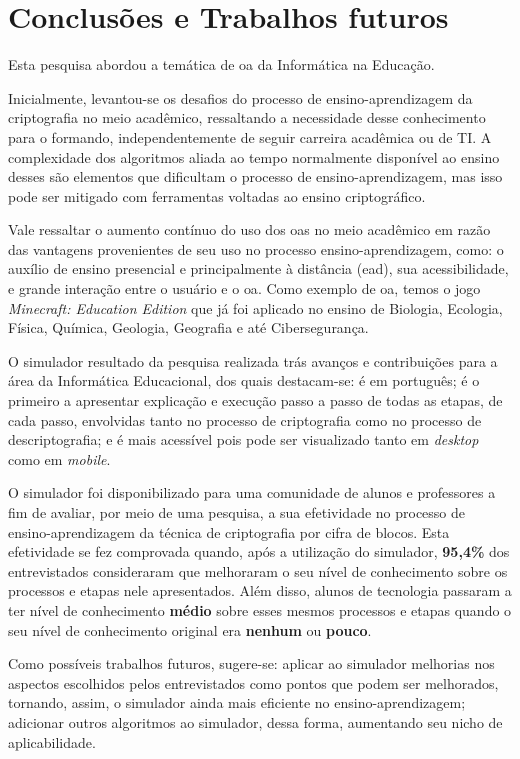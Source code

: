 \chapter{Conclusões e Trabalhos futuros}
\label{char:conclusoesetrabfuturos}
Esta pesquisa abordou a temática de \acrfull{oa} da Informática na Educação.

Inicialmente, levantou-se os desafios do processo de ensino-aprendizagem da criptografia no meio acadêmico, ressaltando a necessidade desse conhecimento para o formando, independentemente de seguir carreira acadêmica ou de TI. A complexidade dos algoritmos aliada ao tempo normalmente disponível ao ensino desses são elementos que dificultam o processo de ensino-aprendizagem, mas isso pode ser mitigado com ferramentas voltadas ao ensino criptográfico.

Vale ressaltar o aumento contínuo do uso dos \acrshort{oas} no meio acadêmico em razão das vantagens provenientes de seu uso no processo ensino-aprendizagem, como: o auxílio de ensino presencial e principalmente à distância (\acrshort{ead}), sua acessibilidade, e grande interação entre o usuário e o \acrshort{oa}. Como exemplo de \acrshort{oa}, temos o jogo \textit{Minecraft: Education Edition} que já foi aplicado no ensino de Biologia, Ecologia, Física, Química, Geologia, Geografia e até Cibersegurança.

O simulador resultado da pesquisa realizada trás avanços e contribuições para a área da Informática Educacional, dos quais destacam-se: é em português; é o primeiro a apresentar explicação e execução passo a passo de todas as etapas, de cada passo, envolvidas tanto no processo de criptografia como no processo de descriptografia; e é mais acessível pois pode ser visualizado tanto em \textit{desktop} como em \textit{mobile}.

O simulador foi disponibilizado para uma comunidade de alunos e professores a fim de avaliar, por meio de uma pesquisa, a sua efetividade no processo de ensino-aprendizagem da técnica de criptografia por cifra de blocos. Esta efetividade se fez comprovada quando, após a utilização do simulador, \textbf{95,4\%} dos entrevistados consideraram que melhoraram o seu nível de conhecimento sobre os processos e etapas nele apresentados. Além disso, alunos de tecnologia passaram a ter nível de conhecimento \textbf{médio} sobre esses mesmos processos e etapas quando o seu nível de conhecimento original era \textbf{nenhum} ou \textbf{pouco}.

Como possíveis trabalhos futuros, sugere-se: aplicar ao simulador melhorias nos aspectos escolhidos pelos entrevistados como pontos que podem ser melhorados, tornando, assim, o simulador ainda mais eficiente no ensino-aprendizagem; adicionar outros algoritmos ao simulador, dessa forma, aumentando seu nicho de aplicabilidade.
